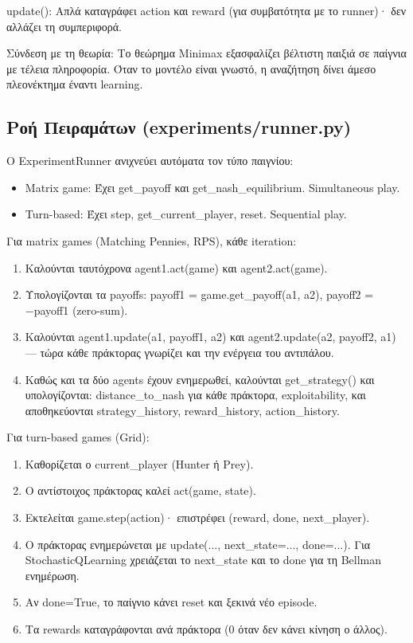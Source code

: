 \documentclass[11pt,a4paper]{article}
\newcommand{\eng}[1]{\foreignlanguage{english}{#1}}
\begin{document}
\eng{update()}: Απλά καταγράφει action και reward (για συμβατότητα με το runner)· δεν αλλάζει τη συμπεριφορά.

Σύνδεση με τη θεωρία: Το θεώρημα Minimax εξασφαλίζει βέλτιστη παιξιά σε παίγνια με τέλεια πληροφορία. Όταν το μοντέλο είναι γνωστό, η αναζήτηση δίνει άμεσο πλεονέκτημα έναντι learning.

\subsection{Ροή Πειραμάτων (\eng{experiments/runner.py})}

Ο \eng{ExperimentRunner} ανιχνεύει αυτόματα τον τύπο παιγνίου:

\begin{itemize}
\item Matrix game: Έχει get\_payoff και get\_nash\_equilibrium. Simultaneous play.
\item Turn-based: Έχει step, get\_current\_player, reset. Sequential play.
\end{itemize}

Για matrix games (Matching Pennies, RPS), κάθε iteration:

\begin{enumerate}
\item Καλούνται ταυτόχρονα agent1.act(game) και agent2.act(game).
\item Υπολογίζονται τα payoffs: payoff1 = game.get\_payoff(a1, a2), payoff2 = −payoff1 (zero-sum).
\item Καλούνται agent1.update(a1, payoff1, a2) και agent2.update(a2, payoff2, a1) — τώρα κάθε πράκτορας γνωρίζει και την ενέργεια του αντιπάλου.
\item Καθώς και τα δύο agents έχουν ενημερωθεί, καλούνται get\_strategy() και υπολογίζονται: distance\_to\_nash για κάθε πράκτορα, exploitability, και αποθηκεύονται strategy\_history, reward\_history, action\_history.
\end{enumerate}

Για turn-based games (Grid):

\begin{enumerate}
\item Καθορίζεται ο current\_player (Hunter ή Prey).
\item Ο αντίστοιχος πράκτορας καλεί act(game, state).
\item Εκτελείται game.step(action)· επιστρέφει (reward, done, next\_player).
\item Ο πράκτορας ενημερώνεται με update(..., next\_state=..., done=...). Για StochasticQLearning χρειάζεται το next\_state και το done για τη Bellman ενημέρωση.
\item Αν done=True, το παίγνιο κάνει reset και ξεκινά νέο episode.
\item Τα rewards καταγράφονται ανά πράκτορα (0 όταν δεν κάνει κίνηση ο άλλος).
\end{enumerate}
\end{document}

